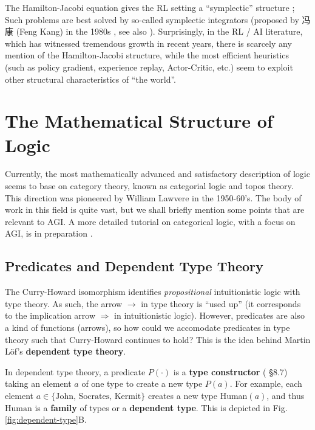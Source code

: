 \documentclass[orivec]{llncs}
\begin{document}
The Hamilton-Jacobi equation gives the RL setting a ``symplectic'' structure \cite{Mann2018};  Such problems are best solved by so-called symplectic integrators (proposed by 冯康 (Feng Kang) in the 1980s \cite{Feng2010}, see also \cite{Leimkuhler2004}).  Surprisingly, in the RL / AI literature, which has witnessed tremendous growth in recent years, there is scarcely any mention of the Hamilton-Jacobi structure, while the most efficient heuristics (such as policy gradient, experience replay, Actor-Critic, etc.) seem to exploit other structural characteristics of ``the world''.

\section{The Mathematical Structure of Logic}

Currently, the most mathematically advanced and satisfactory description of logic seems to base on category theory, known as categorial logic and topos theory.  This direction was pioneered by William Lawvere in the 1950-60's.  The body of work in this field is quite vast, but we shall briefly mention some points that are relevant to AGI.  A more detailed tutorial on categorical logic, with a focus on AGI, is in preparation \cite{Yan2021}.

\subsection{Predicates and Dependent Type Theory}
\label{sec:dependent-types}

The Curry-Howard isomorphism identifies \textit{propositional} intuitionistic logic with type theory.  As such, the arrow $\rightarrow$ in type theory is ``used up'' (it corresponds to the implication arrow $\Rightarrow$ in intuitionistic logic).  However, predicates are also a kind of functions (arrows), so how could we accomodate predicates in type theory such that Curry-Howard continues to hold?  This is the idea behind Martin L\"{o}f's \textbf{dependent type theory}.

In dependent type theory, a predicate $P(\cdot)$ is a \textbf{type constructor} (\cite{Sorensen2006} \S8.7) taking an element $a$ of one type to create a new type $P(a)$.  For example, each element $a \in \{ \text{John, Socrates, Kermit} \}$ creates a new type Human$(a)$, and thus $\mathrm{Human}$ is a \textbf{family} of types or a \textbf{dependent type}.  This is depicted in Fig. \ref{fig:dependent-type}B.
\end{document}
